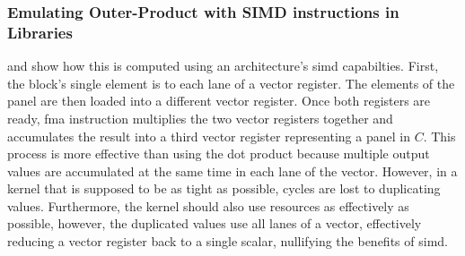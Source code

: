 \documentclass[\main/thesis.tex]{subfiles}
\begin{document}
\subsubsection{Emulating Outer-Product with SIMD instructions in Libraries}
\label{sec:emulateProduct}
 and  show how this is computed using an architecture's \gls{simd} capabilties.
First, the block's single element is  to each \gls{lane} of a vector register.
The elements of the panel are then loaded into a different vector register.
Once both registers are ready,  \gls{fma} instruction multiplies the two vector registers together and accumulates the result into a third vector register representing a panel in $C$.
This process is more effective than using the dot product because multiple output values are accumulated at the same time in each \gls{lane} of the vector.
However, in a kernel that is supposed to be as tight as possible, cycles are lost to duplicating values.
Furthermore, the kernel should also use resources as effectively as possible, however, the duplicated values use all \glspl{lane} of a vector, effectively reducing a vector register back to a single scalar, nullifying the benefits of \gls{simd}.
\end{document}
